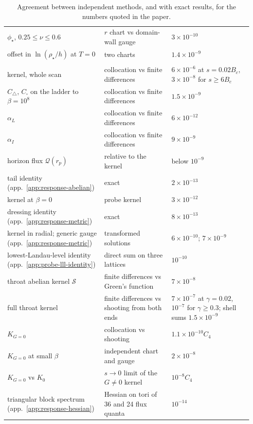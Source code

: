 \begin{table}[p]
\begin{tabular}{>{\raggedright\arraybackslash}p{}>{\raggedright\arraybackslash}p{}>{\raggedright\arraybackslash}p{}}
$\phi_\star$, $0.25 \le \nu \le 0.6$ & $r$ chart vs domain-wall gauge & $3\times10^{-10}$ \\
offset in $\ln(\rho_\star/h)$ at $T = 0$ & two charts & $1.4\times10^{-9}$ \\
\midrule
\multicolumn{3}{l}{\emph{response and kernel} (\ref{app:numerics-response}, \ref{app:numerics-scan})} \\
kernel, whole scan & collocation vs finite differences & $6\times10^{-6}$ at $s = 0.02B_c$, $3\times10^{-8}$ for $s \ge 6B_c$ \\
$C_\triangle$, $C_\square$ on the ladder to $\beta = 10^8$ & collocation vs finite differences & $1.5\times10^{-9}$ \\
$\alpha_L$ & collocation vs finite differences & $6\times10^{-12}$ \\
$\alpha_I$ & collocation vs finite differences & $9\times10^{-9}$ \\
horizon flux $\mathcal{Q}(r_p)$ & relative to the kernel & below $10^{-9}$ \\
tail identity (app.~\ref{app:response-abelian}) & exact & $2\times10^{-13}$ \\
kernel at $\beta = 0$ & probe kernel & $3\times10^{-12}$ \\
dressing identity (app.~\ref{app:response-metric}) & exact & $8\times10^{-13}$ \\
kernel in radial; generic gauge (app.~\ref{app:response-metric}) & transformed solutions & $6\times10^{-10}$; $7\times10^{-9}$ \\
lowest-Landau-level identity (app.~\ref{app:probe-lll-identity}) & direct sum on three lattices & $10^{-10}$ \\
throat abelian kernel $\mathcal{S}$ & finite differences vs Green's function & $7\times10^{-8}$ \\
full throat kernel & finite differences vs shooting from both ends & $7\times10^{-7}$ at $\gamma = 0.02$, $10^{-7}$ for $\gamma \ge 0.3$; shell sums $1.5\times10^{-9}$ \\
$K_{G=0}$ & collocation vs shooting & $1.1\times10^{-10}C_4$ \\
$K_{G=0}$ at small $\beta$ & independent chart and gauge & $2\times10^{-8}$ \\
$K_{G=0}$ vs $K_0$ & $s \to 0$ limit of the $G \neq 0$ kernel & $10^{-8}C_4$ \\
triangular block spectrum (app.~\ref{app:response-hessian}) & Hessian on tori of 36 and 24 flux quanta & $10^{-14}$ \\
\bottomrule
\end{tabular}
\caption{Agreement between independent methods, and with exact results,
for the numbers quoted in the paper.}
\label{tab:checks}
\end{table}

